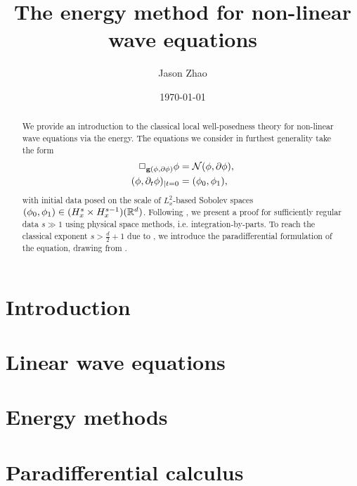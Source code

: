 \documentclass[reqno]{amsart}
\title
{
	The energy method for non-linear wave equations
}
\author{Jason Zhao}
\date{\today}
\begin{document}
\begin{abstract}
	We provide an introduction to the classical local well-posedness theory for non-linear wave equations via the energy. The equations we consider in furthest generality take the form 
		\begin{align*}
			\Box_{{\bf g}(\phi, \partial\phi)} \phi 
				&= \mathcal N (\phi, \partial \phi), \\
			(\phi, \partial_t \phi)_{|t = 0}
				&= (\phi_0, \phi_1),
		\end{align*}
	with initial data posed on the scale of $L^2_x$-based Sobolev spaces $(\phi_0, \phi_1) \in (H^s_x \times H^{s - 1}_x) (\mathbb R^d)$. Following \cite{Sogge1995}, we present a proof for sufficiently regular data $s \gg 1$ using physical space methods, i.e. integration-by-parts. To reach the classical exponent $s > \tfrac{d}{2} + 1$ due to \cite{FischerMarsden1972, HughesEtAl1977}, we introduce the paradifferential formulation of the equation, drawing from \cite{BahouriEtAl2011,Taylor2011b,IfrimTataru2022b}.
\end{abstract}
\maketitle

\tableofcontents

\section{Introduction}


\section{Linear wave equations}


\section{Energy methods}


\section{Paradifferential calculus}




\end{document}
